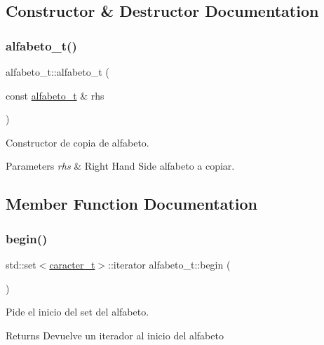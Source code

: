 \subsection{Constructor \& Destructor Documentation}
\mbox{\label{classalfabeto__t_a4ee286fd88a31f2b3f8e0ed62e652d5c}} 
\subsubsection{\texorpdfstring{alfabeto\+\_\+t()}{alfabeto\_t()}}
{\footnotesize\ttfamily alfabeto\+\_\+t\+::alfabeto\+\_\+t (\begin{DoxyParamCaption}\item[{const \hyperlink{classalfabeto__t}{alfabeto\+\_\+t} \&}]{rhs }\end{DoxyParamCaption})}



Constructor de copia de alfabeto. 


\begin{DoxyParams}{Parameters}
{\em rhs} & Right Hand Side alfabeto a copiar. \\
\hline
\end{DoxyParams}


\subsection{Member Function Documentation}
\mbox{\label{classalfabeto__t_a5c28110007c439f8caff59c129ccee5c}} 
\subsubsection{\texorpdfstring{begin()}{begin()}}
{\footnotesize\ttfamily std\+::set$<$\hyperlink{classcaracter__t}{caracter\+\_\+t}$>$\+::iterator alfabeto\+\_\+t\+::begin (\begin{DoxyParamCaption}{ }\end{DoxyParamCaption})\hspace{0.3cm}{\ttfamily [inline]}}



Pide el inicio del set del alfabeto. 

\begin{DoxyReturn}{Returns}
Devuelve un iterador al inicio del alfabeto 
\end{DoxyReturn}
\mbox{\label{classalfabeto__t_a696e28d37a296c4160de83348a84846b}} 
